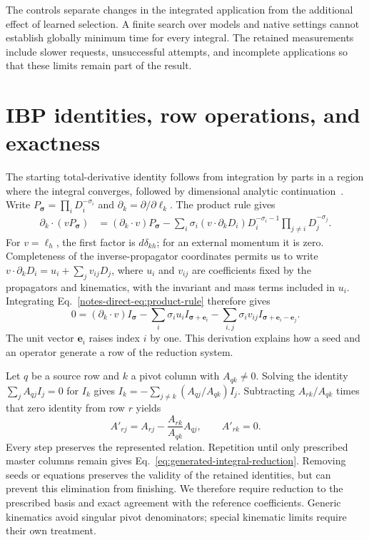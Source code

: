 \documentclass[11pt,a4paper]{article}
\begin{document}
The controls separate changes in the integrated application from the additional effect of learned selection. A finite search over models and native settings cannot establish globally minimum time for every integral. The retained measurements include slower requests, unsuccessful attempts, and incomplete applications so that these limits remain part of the result.
\FloatBarrier

\section{IBP identities, row operations, and exactness}
\label{notes-direct-app:derivation}
The starting total-derivative identity follows from integration by parts in a region where the integral converges, followed by dimensional analytic continuation~\cite{ChetyrkinTkachov,Weinzierl2022}. Write $P_{\boldsymbol\sigma}=\prod_iD_i^{-\sigma_i}$ and $\partial_k=\partial/\partial\ell_k$. The product rule gives
\begin{align}
 \partial_k\!\cdot(vP_{\boldsymbol\sigma})
 &=(\partial_k\!\cdot v)P_{\boldsymbol\sigma}
 -\sum_i\sigma_i(v\!\cdot\partial_kD_i)
 D_i^{-\sigma_i-1}\prod_{j\ne i}D_j^{-\sigma_j}.
 \label{notes-direct-eq:product-rule}
\end{align}
For $v=\ell_h$, the first factor is $d\delta_{kh}$; for an external momentum it is zero. Completeness of the inverse-propagator coordinates permits us to write $v\!\cdot\partial_kD_i=u_i+\sum_jv_{ij}D_j$, where $u_i$ and $v_{ij}$ are coefficients fixed by the propagators and kinematics, with the invariant and mass terms included in $u_i$. Integrating Eq.~\eqref{notes-direct-eq:product-rule} therefore gives
\begin{equation}
 0=(\partial_k\!\cdot v)I_{\boldsymbol\sigma}
 -\sum_i\sigma_i u_i I_{\boldsymbol\sigma+\boldsymbol e_i}
 -\sum_{i,j}\sigma_i v_{ij}
 I_{\boldsymbol\sigma+\boldsymbol e_i-\boldsymbol e_j}.
 \label{notes-direct-eq:index-shifts-new}
\end{equation}
The unit vector $\boldsymbol e_i$ raises index $i$ by one. This derivation explains how a seed and an operator generate a row of the reduction system.

Let $q$ be a source row and $k$ a pivot column with $A_{qk}\ne0$. Solving the identity $\sum_jA_{qj}I_j=0$ for $I_k$ gives $I_k=-\sum_{j\ne k}(A_{qj}/A_{qk})I_j$. Subtracting $A_{rk}/A_{qk}$ times that zero identity from row $r$ yields
\begin{equation}
 A'_{rj}=A_{rj}-\frac{A_{rk}}{A_{qk}}A_{qj},\qquad A'_{rk}=0.
 \label{notes-direct-eq:row-new}
\end{equation}
Every step preserves the represented relation. Repetition until only prescribed master columns remain gives Eq.~\eqref{eq:generated-integral-reduction}. Removing seeds or equations preserves the validity of the retained identities, but can prevent this elimination from finishing. We therefore require reduction to the prescribed basis and exact agreement with the reference coefficients. Generic kinematics avoid singular pivot denominators; special kinematic limits require their own treatment.
\end{document}
